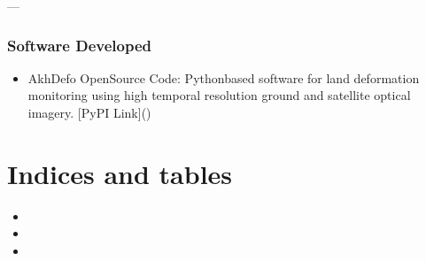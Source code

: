 \documentclass[letterpaper,10pt,english]{sphinxmanual}
\begin{document}
\sphinxAtStartPar
—


\subsection{Software Developed}
\label{\detokenize{CV_Mahmud_2023:software-developed}}\begin{itemize}
\item {} 
\sphinxAtStartPar
AkhDefo Open\sphinxhyphen{}Source Code: Python\sphinxhyphen{}based software for land deformation monitoring using high temporal resolution ground and satellite optical imagery. {[}PyPI Link{]}()

\end{itemize}


\chapter{Indices and tables}
\label{\detokenize{index:indices-and-tables}}\begin{itemize}
\item {} 
\sphinxAtStartPar
{}

\item {} 
\sphinxAtStartPar
{}

\item {} 
\sphinxAtStartPar
{}

\end{itemize}
\end{document}
